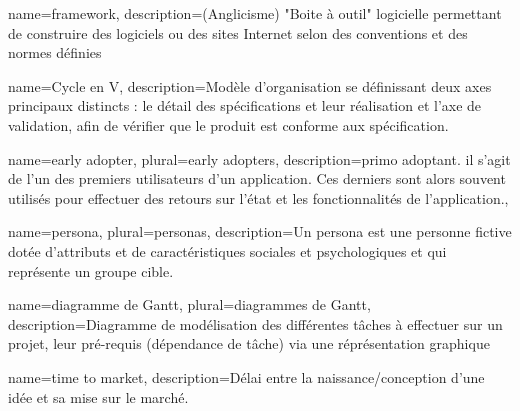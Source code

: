 
\begin{comment}
Glossaire : 
  Nouvelle entrée :
    \newglossaryentry{test} %
    {%
        name={test}, %
        description={<description>}, %
        plural={tests} %
    }
  Usage : 
    \gls{test} Retourne "test"
    \Gls{test} Retourne "Test"
    \glsplural{test} Retourne "tests"
    \Glsplural{test} Retourne "Tests"
        
Pour des mots utilisés fréquemment, petite astuce : 
	\newcommand{\bsr}{bilan scientifique régional} 
Ensuite, dans le contenu, il suffit d'y faire référence comme ceci : "\bsr{}"
\end{comment}


{%
    name={framework},
    description={(Anglicisme) "Boite à outil" logicielle permettant de construire des logiciels ou des sites Internet selon des conventions et des normes définies}
}

{%
	name={Cycle en V},
	description={Modèle d'organisation se définissant deux axes principaux distincts : le détail des spécifications et leur réalisation et l'axe de validation, afin de vérifier que le produit est conforme aux spécification.}
}

{%
	name={early adopter},
	plural={early adopters},
	description={primo adoptant. il s'agit de l'un des premiers utilisateurs d'un application. Ces derniers sont alors souvent utilisés pour effectuer des retours sur l'état et les fonctionnalités de l'application.},
}

{
	name={persona},
	plural={personas},
	description={Un persona est une personne fictive dotée d'attributs et de caractéristiques sociales et psychologiques et qui représente un groupe cible.}
}

{
	name={diagramme de Gantt},
	plural={diagrammes de Gantt},
	description={Diagramme de modélisation des différentes tâches à effectuer sur un projet, leur pré-requis (dépendance de tâche) via une réprésentation graphique}
}

{
	name={time to market},
	description={Délai entre la naissance/conception d'une idée et sa mise sur le marché.}
}

